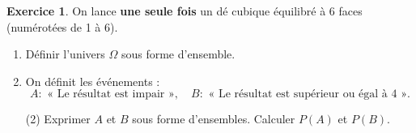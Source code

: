 \documentclass{exam}
\theoremstyle{definition}
\newtheorem{exercice}{Exercice}
\begin{document}

\vspace{2mm}
\noindent
{}

\begin{exercice}

On lance \textbf{une seule fois} un dé cubique équilibré à 6 faces (numérotées de 1 à 6).

\begin{enumerate}
  \item Définir l'univers \(\Omega\) sous forme d'ensemble.
  \item On définit les événements :
  \[
    A : \text{ « Le résultat est impair »},\quad
    B : \text{ « Le résultat est supérieur ou égal à 4 »}.
  \]
    \begin{tasks}(2)
      \task Exprimer \(A\) et \(B\) sous forme d'ensembles.
      \task Calculer \(P(A)\) et \(P(B)\).
    \end{tasks}
\end{enumerate}

\begin{center}
\end{center}
\end{exercice}
\end{document}
